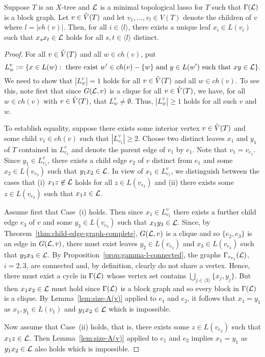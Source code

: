 \begin{pro}\label{prop:x-i-unique}
  Suppose $T$ is an $X$-tree and ${\mathcal L}$ is a minimal topological lasso for $T$
  such that $\Gamma({\mathcal L})$ is a block graph.  Let $v\in \mathring{V}(T)$ and let
  $v_1,\ldots, v_l\in V(T)$ denote the children of $v$ where $l=|ch(v)|$.
  Then, for all $i\in \langle l\rangle$, there exists a unique leaf $x_i\in
  L(v_i)$ such that $x_sx_t\in {\mathcal L}$ holds for all $s,t\in\langle l\rangle$
  distinct.
\end{pro}
\begin{proof}
  For all $v\in \mathring{V}(T)$ and all $w\in ch(v)$, put
$$
L^v_w:=\{x\in L(w): \mbox{ there exist } w'\in ch(v)-\{w\}
\mbox{ and } y\in L(w')
\mbox{ such that } xy\in {\mathcal L}  \}.
$$
We need to show that $|L^v_w|=1$ holds for all $v\in \mathring{V}(T)$ and all $w\in
ch(v)$. To see this, note first that since $G({\mathcal L},v)$ is a clique for all
$v\in \mathring{V}(T)$, we have, for all $w\in ch(v)$ with $v\in \mathring{V}(T)$, that
$L^v_w\not=\emptyset$.  Thus, $|L^v_w|\geq 1$ holds for all such $v$ and $w$.

To establish equality, suppose there exists some interior vertex $v\in \mathring{V}(T)$
and some child $v_1\in ch(v)$ such that $|L^v_{v_1}|\geq 2$.  Choose two
distinct leaves $x_1$ and $y_1$ of $T$ contained in $L^v_{v_1}$ and denote the
parent edge of $v_1$ by $e_1$. Note that $v_1=v_{e_1}$.  Since $y_1\in
L^v_{v_1}$, there exists a child edge $e_2$ of $v$ distinct from $e_1$ and
some $x_2\in L(v_{e_2})$ such that $y_1x_2\in{\mathcal L}$. In view of $x_1\in
L^v_{v_1}$, we distinguish between the cases that (i) $x_1z\not\in{\mathcal L}$ holds
for all $z\in L(v_{e_2})$ and (ii) there exists some $z\in L(v_{e_2})$ such
that $x_1z\in{\mathcal L}$.

Assume first that Case~(i) holds.  Then since $x_1\in L^v_{v_1}$ there exists
a further child edge $e_3$ of $v$ and some $y_3\in L(v_{e_3})$ such that
$x_1y_3\in{\mathcal L}$.  Since, by Theorem~\ref{thm:child-edge-graph-complete},
$G({\mathcal L},v)$ is a clique and so $\{e_2,e_3\}$ is an edge in $G({\mathcal L},v)$, there
must exist leaves $y_2\in L(v_{e_2})$ and $x_3\in L(v_{e_3})$ such that
$y_2x_3\in{\mathcal L}$. By Proposition~\ref{prop:gamma-l-connected}, the graphs
$\Gamma_{v_{e_i}}({\mathcal L})$, $i=2,3$, are connected and, by definition, clearly do
not share a vertex. Hence, there must exist a cycle in $\Gamma({\mathcal L})$ whose
vertex set contains $\bigcup_{j\in\langle 3\rangle} \{x_j,y_j\}$. But then
$x_1x_2\in {\mathcal L}$ must hold since $\Gamma({\mathcal L})$ is a block graph and so every
block in $\Gamma({\mathcal L})$ is a clique. By Lemma~\ref{lem:size-A(v)} applied to
$e_1$ and $e_2$, it follows that $x_1=y_1$ as $x_1,y_1\in L(v_1)$ and
$y_1x_2\in {\mathcal L}$ which is impossible.

Now assume that Case~(ii) holds, that is, there exists some $z\in L(v_{e_2})$
such that $x_1z\in{\mathcal L}$. Then Lemma~\ref{lem:size-A(v)} applied to $e_1$ and
$e_2$ implies $x_1=y_1$ as $y_1x_2\in{\mathcal L}$ also holds which is impossible.
\qquad
\end{proof}

